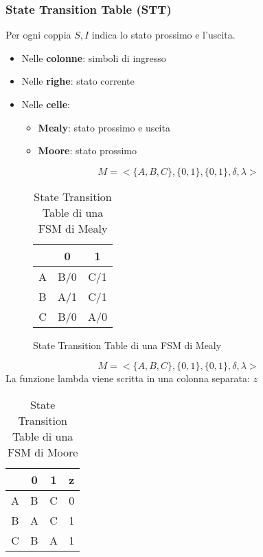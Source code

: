 \documentclass[a4paper]{article}
\theoremstyle{break}
\theoremstyle{break}
\theoremstyle{break}
\theoremstyle{break}
\begin{document}
\subsubsection{State Transition Table (STT)}
Per ogni coppia \( S,I \) indica lo stato prossimo e l'uscita.
\begin{itemize}
  \item Nelle \textbf{colonne}: simboli di ingresso
  \item Nelle \textbf{righe}: stato corrente
  \item Nelle \textbf{celle}: 
    \begin{itemize}
      \item \textbf{Mealy}: stato prossimo e uscita
      \item \textbf{Moore}: stato prossimo
    \end{itemize}
\end{itemize}

\begin{figure}[H]
  \begin{example}[Mealy]
    \[ M= <\{A,B,C\}, \{0,1\}, \{0,1\}, \delta, \lambda> \]
    \begin{table}[H]
      \begin{center}
        \begin{tabular}{c|c|c}
          & 0 & 1 \\
          \hline
          A & B/0 & C/1\\
          \hline
          B & A/1 & C/1\\
          \hline
          C & B/0 & A/0\\
        \end{tabular}
      \end{center}
      \caption{State Transition Table di una FSM di Mealy}
    \end{table}
  \end{example}
\end{figure}

\begin{example}[Moore]
  \[ M= <\{A,B,C\}, \{0,1\}, \{0,1\}, \delta, \lambda> \]
  La funzione lambda viene scritta in una colonna separata: \( z \) 
  \begin{table}[H]
    \begin{center}
      \begin{tabular}{c|c|c|c}
          & 0 & 1 & z\\
        \hline
        A & B & C & 0 \\
        \hline
        B & A & C & 1 \\
        \hline
        C & B & A & 1 \\
      \end{tabular}
    \end{center}
    \caption{State Transition Table di una FSM di Moore}
  \end{table}
\end{example}
\end{document}
